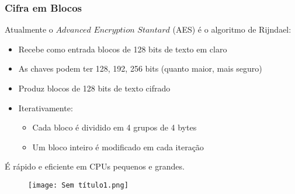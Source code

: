 \documentclass[10pt,a4paper]{report}
\begin{document}
\subsubsection{Cifra em Blocos}
Atualmente o $Advanced$ $Encryption$ $Stantard$ (AES) é o algoritmo de Rijndael:
\begin{itemize}
\item Recebe como entrada blocos de 128 bits de texto em claro
\item As chaves podem ter 128, 192, 256 bits (quanto maior, mais seguro)
\item Produz blocos de 128 bits de texto cifrado
\item Iterativamente:
\begin{itemize}
\item Cada bloco é dividido em 4 grupos de 4 bytes
\item Um bloco inteiro é modificado em cada iteração
\end{itemize}
\end{itemize}
É rápido e eficiente em CPUs pequenos e grandes.
\begin{figure}[H]
\centering
\texttt{[image: Sem título1.png]}
\end{figure}
\end{document}
